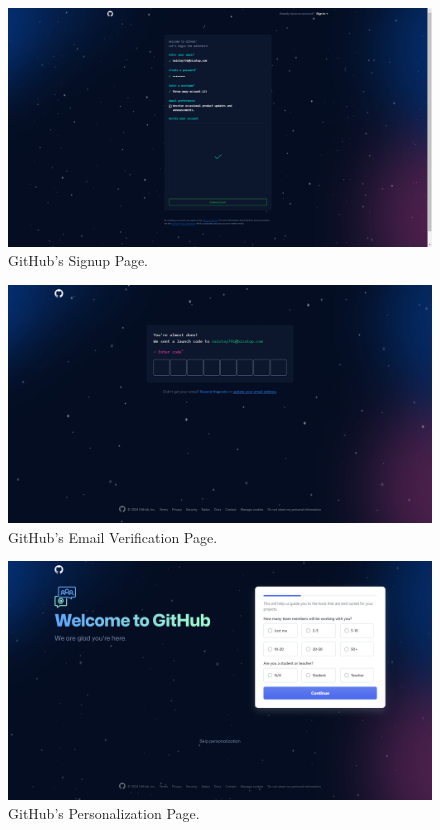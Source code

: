 \documentclass{article}
\begin{document}

\begin{figure}[p]
	\centering
	\includegraphics[width=\textwidth]{adventure.png}
	\caption{GitHub's Signup Page.}
	\label{fig:adventure}
\end{figure}

\begin{figure}[p]
	\centering
	\includegraphics[width=\textwidth]{almost-done.png}
	\caption{GitHub's Email Verification Page.}
	\label{fig:almost-done}
\end{figure}

\begin{figure}[p]
	\centering
	\includegraphics[width=\textwidth]{skip-personalization.png}
	\caption{GitHub's Personalization Page.}
	\label{fig:skip-personalization}
\end{figure}
\end{document}
